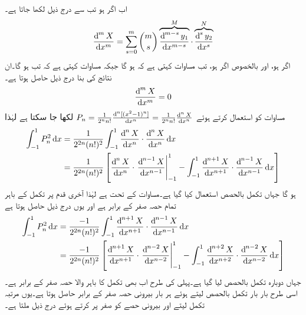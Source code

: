 اب اگر  ہو تب  سے درج ذیل لکھا جاتا ہے۔
\begin{align*}
\frac{\dif^{\, m}X}{\dif x^m}=\sum_{s=0}^{m}\binom{m}{s}\overbrace{\frac{\dif^{\,m-s}y_1}{\dif x^{m-s}}}^{M}\cdot \overbrace{\frac{\dif^{\,s}y_2}{\dif x^s}}^{N}
\end{align*}
اگر  ہو، اور بالخصوص اگر  ہو، تب مساوات  کہتی ہے کہ   ہو گا جبکہ مساوات  کہتی ہے کہ تب  ہو گا۔ان نتائج کی بنا درج ذیل حاصل ہوتا ہے۔
\begin{align}\label{مساوات_بیسل_سوال_عمومی_پ}
\frac{\dif^{\, m}X}{\dif x^m}=0
\end{align}
مساوات  کو استعمال کرتے ہوئے
$P_n=\frac{1}{2^n n!} \frac{\dif^{\,n} [(x^2-1)^n]}{\dif x^n}=\frac{1}{2^n n!} \frac{\dif^{\,n} X}{\dif x^n}$
لکھا جا سکتا ہے لہٰذا
\begin{align*}
\int_{-1}^{1} P_n^2  \dif x&=\frac{1}{2^{2n}(n!)^2}\int_{-1}^{1}\frac{\dif^{\,n} X}{\dif x^n} \cdot \frac{\dif^{\,n}X}{\dif x^n} \dif x\\
&=\frac{1}{2^{2n}(n!)^2}\left[\frac{\dif^{\,n} X}{\dif x^n} \cdot \left. \frac{\dif^{\,n-1}X}{\dif x^{n-1}}\right|_{-1}^{1}-\int_{-1}^{1}\frac{\dif^{\,n+1} X}{\dif x^{n+1}} \cdot \frac{\dif^{\,n-1}X}{\dif x^{n-1}} \dif x\right]
\end{align*}
ہو گا جہاں تکمل بالحصص استعمال کیا گیا ہے۔مساوات  کے تحت
  ہے لہٰذا آخری قدم پر تکمل کے باہر تمام حصہ صفر کے برابر ہے اور یوں  درج ذیل حاصل ہوتا ہے
\begin{align*}
\int_{-1}^{1} P_n^2  \dif x&=\frac{-1}{2^{2n}(n!)^2}\int_{-1}^{1}\frac{\dif^{\,n+1} X}{\dif x^{n+1}} \cdot \frac{\dif^{\,n-1}X}{\dif x^{n-1}}\dif x\\
&=\frac{-1}{2^{2n}(n!)^2}\left[\frac{\dif^{\,n+1} X}{\dif x^{n+1}} \cdot \left. \frac{\dif^{\,n-2}X}{\dif x^{n-2}}\right|_{-1}^{1}-\int_{-1}^{1}\frac{\dif^{\,n+2} X}{\dif x^{n+2}} \cdot \frac{\dif^{\,n-2}X}{\dif x^{n-2}}\dif x \right]
\end{align*}
جہاں دوبارہ تکمل بالحصص لیا گیا ہے۔پہلی کی طرح اب بھی تکمل کا باہر والا حصہ صفر کے برابر ہے۔ اسی طرح بار بار تکمل بالحصص لیتے ہوئے ہر بار بیرونی حصہ صفر کے برابر حاصل ہوتا ہے۔یوں  مرتبہ تکمل لیتے اور بیرونی حصے کو صفر پر کرتے ہوئے درج ذیل ملتا ہے۔
